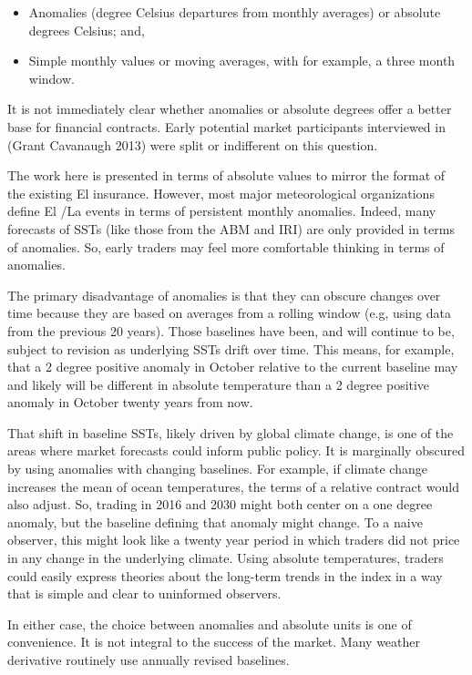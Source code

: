 \documentclass[article]{jss}
\begin{document}
\begin{itemize}
\itemsep1pt\parskip0pt
\item
  Anomalies (degree Celsius departures from monthly averages) or
  absolute degrees Celsius; and,
\item
  Simple monthly values or moving averages, with for example, a three
  month window.
\end{itemize}

It is not immediately clear whether anomalies or absolute degrees offer
a better base for financial contracts. Early potential market
participants interviewed in (Grant Cavanaugh 2013) were split or
indifferent on this question.

The work here is presented in terms of absolute values to mirror the
format of the existing El  insurance. However, most major
meteorological organizations define El /La 
events in terms of persistent monthly anomalies. Indeed, many forecasts
of SSTs (like those from the ABM and IRI) are only provided in terms of
anomalies. So, early traders may feel more comfortable thinking in terms
of anomalies.

The primary disadvantage of anomalies is that they can obscure changes
over time because they are based on averages from a rolling window (e.g,
using data from the previous 20 years). Those baselines have been, and
will continue to be, subject to revision as underlying SSTs drift over
time. This means, for example, that a 2 degree positive anomaly in
October relative to the current baseline may and likely will be
different in absolute temperature than a 2 degree positive anomaly in
October twenty years from now.

That shift in baseline SSTs, likely driven by global climate change, is
one of the areas where market forecasts could inform public policy. It
is marginally obscured by using anomalies with changing baselines. For
example, if climate change increases the mean of ocean temperatures, the
terms of a relative contract would also adjust. So, trading in 2016 and
2030 might both center on a one degree anomaly, but the baseline
defining that anomaly might change. To a naive observer, this might look
like a twenty year period in which traders did not price in any change
in the underlying climate. Using absolute temperatures, traders could
easily express theories about the long-term trends in the index in a way
that is simple and clear to uninformed observers.

In either case, the choice between anomalies and absolute units is one
of convenience. It is not integral to the success of the market. Many
weather derivative routinely use annually revised baselines.
\end{document}
